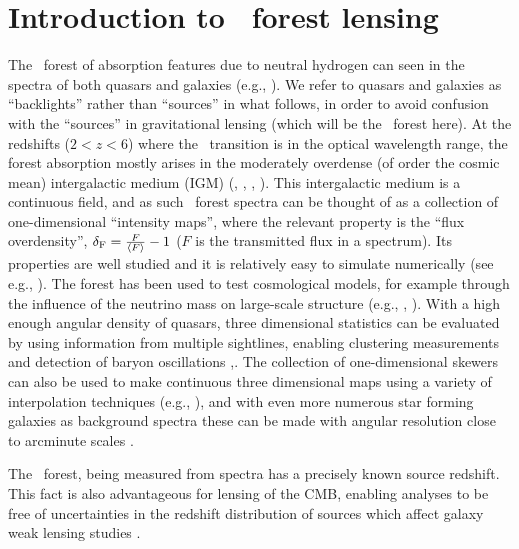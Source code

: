 \section{Introduction to \lya\ forest lensing}

The \lya\ forest of absorption features due to neutral hydrogen can
seen in the spectra of both quasars \cite{rauch1998} and galaxies (e.g.,
\cite{savaglio2002}).  We refer to quasars and galaxies as
``backlights'' rather than ``sources'' in what follows, in order to
avoid confusion with the ``sources'' in gravitational lensing (which
will be the \lya\ forest here). At the redshifts ($2 < z
< 6$) where the \lya\ transition is in the optical wavelength
range, the forest absorption mostly arises in the moderately overdense
(of order the cosmic mean) intergalactic medium (IGM) (\cite{bi1993}, 
\cite{cen1994}, \cite{zhang1995}, \cite{hernquist1996}).
  This intergalactic medium is a continuous field, and as such
\lya\ forest spectra can be thought of as a collection of
one-dimensional ``intensity maps'',
where the relevant property is the ``flux overdensity'', $\delta_{\rm F}=\frac{F}{\langle F \rangle} -1$ ($F$
is the transmitted flux in a spectrum).  Its properties are well
studied and it is relatively easy to simulate numerically (see e.g.,
\cite{bolton2017}). The forest has been used to test
cosmological models, for example through the influence of the neutrino
mass on large-scale structure (e.g., \cite{pal2015}, \cite{croft1999}).
  With a high enough angular
density of quasars, three dimensional statistics can be evaluated by
using information from multiple sightlines, enabling clustering
measurements and detection of baryon
oscillations \citep{busca2013},. The
collection of one-dimensional skewers can also be used to make
continuous three dimensional maps using a variety of interpolation
techniques (e.g., \cite{cisewski}), and
with even more numerous star forming galaxies as background spectra
these can be made with angular resolution close to arcminute scales
\citep{Lee2014}.

The \lya\ forest, being measured from spectra has a precisely known
source redshift. This fact is also advantageous for lensing of the
CMB, enabling analyses to be free of uncertainties in the redshift
distribution of sources which affect galaxy weak lensing studies
\citep{hearin2010}.


